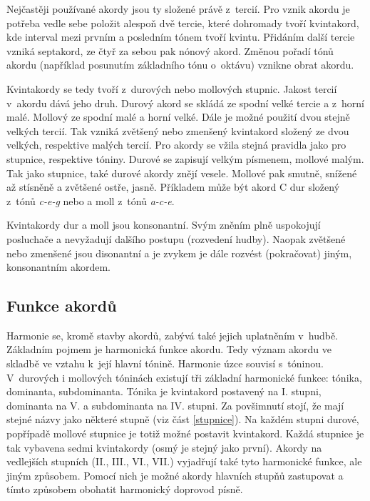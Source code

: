 Nejčastěji používané akordy jsou ty složené právě z~tercií.
Pro vznik akordu je potřeba vedle sebe položit alespoň dvě tercie,
které dohromady tvoří kvintakord, 
kde interval mezi prvním a posledním tónem tvoří kvintu.
Přidáním další tercie vzniká septakord, ze čtyř za sebou pak nónový akord.
Změnou pořadí tónů akordu (například posunutím základního tónu o~oktávu) 
vznikne obrat akordu.
\cite{zenkl}
\par

Kvintakordy se tedy tvoří z~durových nebo mollových stupnic.
Jakost tercií v~akordu dává jeho druh.
Durový akord se skládá ze spodní velké tercie a z~horní malé.
Mollový ze spodní malé a horní velké.
Dále je možné použití dvou stejně velkých tercií.
Tak vzniká zvětšený nebo zmenšený kvintakord 
složený ze dvou velkých, respektive malých tercií.
\cite{kofron}
Pro akordy se vžila stejná pravidla jako pro stupnice, respektive tóniny.
Durové se zapisují velkým písmenem, mollové malým.
Tak jako stupnice, také durové akordy znějí vesele.
Mollové pak smutně, snížené až stísněně a zvětšené ostře, jasně.
\cite{cmiral}
Příkladem může být akord C dur složený z~tónů \emph{c-e-g} 
nebo a moll z~tónů \emph{a-c-e}.
\par

Kvintakordy dur a moll jsou konsonantní.
Svým zněním plně uspokojují posluchače a nevyžadují dalšího postupu (rozvedení hudby).
Naopak zvětšené nebo zmenšené jsou disonantní 
a je zvykem je dále rozvést (pokračovat) jiným, konsonantním akordem.
\cite{cmiral}

\subsection{Funkce akordů}
Harmonie se, kromě stavby akordů, zabývá také jejich uplatněním v~hudbě.
Základním pojmem je harmonická funkce akordu.
Tedy význam akordu ve skladbě ve vztahu k~její hlavní tónině.
Harmonie úzce souvisí s~tóninou.
V~durových i mollových tóninách existují tři základní harmonické funkce: 
tónika, dominanta, subdominanta.
Tónika je kvintakord postavený na I. stupni, dominanta na V. a subdominanta na IV. stupni.
Za povšimnutí stojí, že mají stejné názvy jako některé stupně  
(viz část \ref{stupnice}).
Na každém stupni durové, popřípadě mollové stupnice je totiž možné postavit kvintakord.
Každá stupnice je tak vybavena sedmi kvintakordy 
(osmý je stejný jako první).
Akordy na vedlejších stupních (II., III., VI., VII.)
vyjadřují také tyto harmonické funkce, ale jiným způsobem.
Pomocí nich je možné akordy hlavních stupňů zastupovat
a tímto způsobem obohatit harmonický doprovod písně.
\cite{kofron,zenkl}
\par

